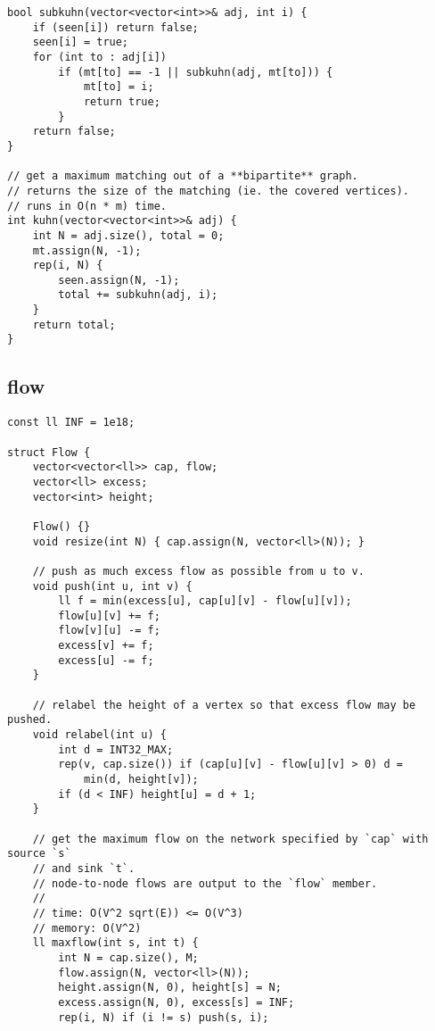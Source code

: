 \documentclass[twoside]{article}
\begin{document}
\begin{multicols*}{2}
\begin{verbatim}
bool subkuhn(vector<vector<int>>& adj, int i) {
    if (seen[i]) return false;
    seen[i] = true;
    for (int to : adj[i])
        if (mt[to] == -1 || subkuhn(adj, mt[to])) {
            mt[to] = i;
            return true;
        }
    return false;
}

// get a maximum matching out of a **bipartite** graph.
// returns the size of the matching (ie. the covered vertices).
// runs in O(n * m) time.
int kuhn(vector<vector<int>>& adj) {
    int N = adj.size(), total = 0;
    mt.assign(N, -1);
    rep(i, N) {
        seen.assign(N, -1);
        total += subkuhn(adj, i);
    }
    return total;
}
\end{verbatim}

{
\subsection*{flow}
}
\begin{verbatim}
const ll INF = 1e18;

struct Flow {
    vector<vector<ll>> cap, flow;
    vector<ll> excess;
    vector<int> height;

    Flow() {}
    void resize(int N) { cap.assign(N, vector<ll>(N)); }

    // push as much excess flow as possible from u to v.
    void push(int u, int v) {
        ll f = min(excess[u], cap[u][v] - flow[u][v]);
        flow[u][v] += f;
        flow[v][u] -= f;
        excess[v] += f;
        excess[u] -= f;
    }

    // relabel the height of a vertex so that excess flow may be pushed.
    void relabel(int u) {
        int d = INT32_MAX;
        rep(v, cap.size()) if (cap[u][v] - flow[u][v] > 0) d =
            min(d, height[v]);
        if (d < INF) height[u] = d + 1;
    }

    // get the maximum flow on the network specified by `cap` with source `s`
    // and sink `t`.
    // node-to-node flows are output to the `flow` member.
    //
    // time: O(V^2 sqrt(E)) <= O(V^3)
    // memory: O(V^2)
    ll maxflow(int s, int t) {
        int N = cap.size(), M;
        flow.assign(N, vector<ll>(N));
        height.assign(N, 0), height[s] = N;
        excess.assign(N, 0), excess[s] = INF;
        rep(i, N) if (i != s) push(s, i);


\end{verbatim}
\end{multicols*}
\end{document}
